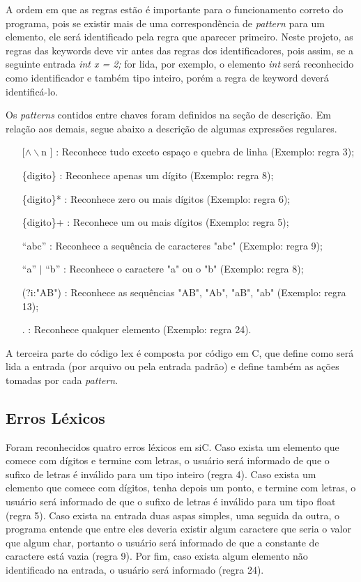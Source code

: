 \documentclass[12pt]{article}
\begin{document}
\indent A ordem em que as regras estão é importante para o funcionamento correto do programa, pois se existir mais de uma correspondência de \textit{pattern} para um elemento, ele será identificado pela regra que aparecer primeiro. Neste projeto, as regras das keywords deve vir antes das regras dos identificadores, pois assim, se a seguinte entrada \textit{int x = 2;} for lida, por exemplo, o elemento \textit{int} será reconhecido como identificador e também tipo inteiro, porém a regra de keyword deverá identificá-lo.

\indent Os \textit{patterns} contidos entre chaves foram definidos na seção de descrição. Em relação aos demais, segue abaixo a descrição de algumas expressões regulares. 

\begin{itemize}
  \item[ [$\wedge\backslash$n] ] : Reconhece tudo exceto espaço e quebra de linha (Exemplo: regra 3);
  \item[\{digito\}] : Reconhece apenas um dígito (Exemplo: regra 8);
  \item[\{digito\}*] : Reconhece zero ou mais dígitos (Exemplo: regra 6);
  \item[\{digito\}+] : Reconhece um ou mais dígitos (Exemplo: regra 5);
  \item[``abc''] : Reconhece a sequência de caracteres "abc" (Exemplo: regra 9);
  \item[``a'' $\vert$ ``b''] : Reconhece o caractere "a" ou o "b" (Exemplo: regra 8);
  \item[(?i:"AB")] : Reconhece as sequências "AB", "Ab", "aB", "ab" (Exemplo: regra 13);
  \item[.] : Reconhece qualquer elemento (Exemplo: regra 24).
\end{itemize}

\indent A terceira parte do código lex é composta por código em C, que define como será lida a entrada (por arquivo ou pela entrada padrão) e define também as ações tomadas por cada \textit{pattern}.

\subsection{Erros Léxicos}

\indent Foram reconhecidos quatro erros léxicos em siC. Caso exista um elemento que comece com dígitos e termine com letras, o usuário será informado de que o sufixo de letras é inválido para um tipo inteiro (regra 4). Caso exista um elemento que comece com dígitos, tenha depois um ponto, e termine com letras, o usuário será informado de que o sufixo de letras é inválido para um tipo float (regra 5). Caso exista na entrada duas aspas simples, uma seguida da outra, o programa entende que entre eles deveria existir algum caractere que seria o valor que algum char, portanto o usuário será informado de que a constante de caractere está vazia (regra 9). Por fim, caso exista algum elemento não identificado na entrada, o usuário será informado (regra 24).
\end{document}

